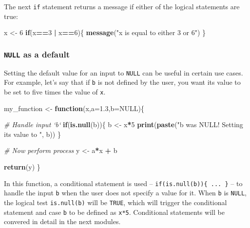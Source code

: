 \documentclass[
]{book}
\newenvironment{Shaded}{\begin{snugshade}}{\end{snugshade}}
\newcommand{\CommentTok}[1]{\textcolor[rgb]{0.56,0.35,0.01}{\textit{#1}}}
\newcommand{\ControlFlowTok}[1]{\textcolor[rgb]{0.13,0.29,0.53}{\textbf{#1}}}
\newcommand{\DataTypeTok}[1]{\textcolor[rgb]{0.13,0.29,0.53}{#1}}
\newcommand{\DecValTok}[1]{\textcolor[rgb]{0.00,0.00,0.81}{#1}}
\newcommand{\FloatTok}[1]{\textcolor[rgb]{0.00,0.00,0.81}{#1}}
\newcommand{\KeywordTok}[1]{\textcolor[rgb]{0.13,0.29,0.53}{\textbf{#1}}}
\newcommand{\NormalTok}[1]{#1}
\newcommand{\OperatorTok}[1]{\textcolor[rgb]{0.81,0.36,0.00}{\textbf{#1}}}
\newcommand{\OtherTok}[1]{\textcolor[rgb]{0.56,0.35,0.01}{#1}}
\newcommand{\StringTok}[1]{\textcolor[rgb]{0.31,0.60,0.02}{#1}}
\begin{document}
The next \texttt{if} statement returns a message if either of the logical statements are true:

\begin{Shaded}
\begin{Highlighting}[]
\NormalTok{x <-}\StringTok{ }\DecValTok{6}
\ControlFlowTok{if}\NormalTok{(x}\OperatorTok{==}\DecValTok{3} \OperatorTok{|}\StringTok{ }\NormalTok{x}\OperatorTok{==}\DecValTok{6}\NormalTok{)\{}
  \KeywordTok{message}\NormalTok{(}\StringTok{"x is equal to either 3 or 6"}\NormalTok{)}
\NormalTok{\}}
\end{Highlighting}
\end{Shaded}

\hypertarget{null-as-a-default}{%
\subsubsection*{\texorpdfstring{\texttt{NULL} as a default}{NULL as a default}}\label{null-as-a-default}}

Setting the default value for an input to \texttt{NULL} can be useful in certain use cases. For example, let's say that if \texttt{b} is not defined by the user, you want its value to be set to five times the value of \texttt{x}.

\begin{Shaded}
\begin{Highlighting}[]
\NormalTok{my_function <-}\StringTok{ }\ControlFlowTok{function}\NormalTok{(x,}\DataTypeTok{a=}\FloatTok{1.3}\NormalTok{,}\DataTypeTok{b=}\OtherTok{NULL}\NormalTok{)\{}
  
  \CommentTok{# Handle input `b`}
  \ControlFlowTok{if}\NormalTok{(}\KeywordTok{is.null}\NormalTok{(b))\{}
\NormalTok{    b <-}\StringTok{ }\NormalTok{x}\OperatorTok{*}\DecValTok{5}
    \KeywordTok{print}\NormalTok{(}\KeywordTok{paste}\NormalTok{(}\StringTok{"b was NULL! Setting its value to "}\NormalTok{, b))}
\NormalTok{  \}}
  
  \CommentTok{# Now perform process}
\NormalTok{  y <-}\StringTok{ }\NormalTok{a}\OperatorTok{*}\NormalTok{x }\OperatorTok{+}\StringTok{ }\NormalTok{b}
  
  \KeywordTok{return}\NormalTok{(y)}
\NormalTok{\}}
\end{Highlighting}
\end{Shaded}

In this function, a conditional statement is used -- \texttt{if(is.null(b))\{\ ...\ \}} -- to handle the input \texttt{b} when the user does not specify a value for it. When \texttt{b} is \texttt{NULL}, the logical test \texttt{is.null(b)} will be \texttt{TRUE}, which will trigger the conditional statement and case \texttt{b} to be defined as \texttt{x*5}. Conditional statements will be convered in detail in the next modules.
\end{document}
